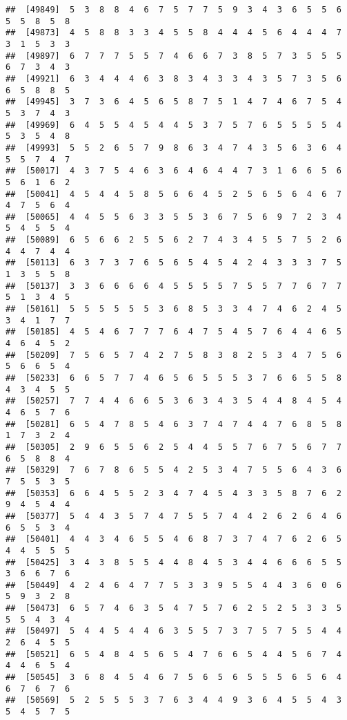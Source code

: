 \documentclass[
]{book}
\begin{document}
\begin{verbatim}
##  [49849]  5  3  8  8  4  6  7  5  7  7  5  9  3  4  3  6  5  5  6  5  5  8  5  8
##  [49873]  4  5  8  8  3  3  4  5  5  8  4  4  4  5  6  4  4  4  7  3  1  5  3  3
##  [49897]  6  7  7  7  5  5  7  4  6  6  7  3  8  5  7  3  5  5  5  6  7  3  4  3
##  [49921]  6  3  4  4  4  6  3  8  3  4  3  3  4  3  5  7  3  5  6  6  5  8  8  5
##  [49945]  3  7  3  6  4  5  6  5  8  7  5  1  4  7  4  6  7  5  4  5  3  7  4  3
##  [49969]  6  4  5  5  4  5  4  4  5  3  7  5  7  6  5  5  5  5  4  5  3  5  4  8
##  [49993]  5  5  2  6  5  7  9  8  6  3  4  7  4  3  5  6  3  6  4  5  5  7  4  7
##  [50017]  4  3  7  5  4  6  3  6  4  6  4  4  7  3  1  6  6  5  6  5  6  1  6  2
##  [50041]  4  5  4  4  5  8  5  6  6  4  5  2  5  6  5  6  4  6  7  4  7  5  6  4
##  [50065]  4  4  5  5  6  3  3  5  5  3  6  7  5  6  9  7  2  3  4  5  4  5  5  4
##  [50089]  6  5  6  6  2  5  5  6  2  7  4  3  4  5  5  7  5  2  6  4  4  7  4  4
##  [50113]  6  3  7  3  7  6  5  6  5  4  5  4  2  4  3  3  3  7  5  1  3  5  5  8
##  [50137]  3  3  6  6  6  6  4  5  5  5  5  7  5  5  7  7  6  7  7  5  1  3  4  5
##  [50161]  5  5  5  5  5  5  3  6  8  5  3  3  4  7  4  6  2  4  5  3  4  1  7  7
##  [50185]  4  5  4  6  7  7  7  6  4  7  5  4  5  7  6  4  4  6  5  4  6  4  5  2
##  [50209]  7  5  6  5  7  4  2  7  5  8  3  8  2  5  3  4  7  5  6  5  6  6  5  4
##  [50233]  6  6  5  7  7  4  6  5  6  5  5  5  3  7  6  6  5  5  8  4  3  4  5  5
##  [50257]  7  7  4  4  6  6  5  3  6  3  4  3  5  4  4  8  4  5  4  4  6  5  7  6
##  [50281]  6  5  4  7  8  5  4  6  3  7  4  7  4  4  7  6  8  5  8  1  7  3  2  4
##  [50305]  2  9  6  5  5  6  2  5  4  4  5  5  7  6  7  5  6  7  7  6  5  8  8  4
##  [50329]  7  6  7  8  6  5  5  4  2  5  3  4  7  5  5  6  4  3  6  7  5  5  3  5
##  [50353]  6  6  4  5  5  2  3  4  7  4  5  4  3  3  5  8  7  6  2  9  4  5  4  4
##  [50377]  5  4  4  3  5  7  4  7  5  5  7  4  4  2  6  2  6  4  6  6  5  5  3  4
##  [50401]  4  4  3  4  6  5  5  4  6  8  7  3  7  4  7  6  2  6  5  4  4  5  5  5
##  [50425]  3  4  3  8  5  5  4  4  8  4  5  3  4  4  6  6  6  5  5  3  6  6  7  6
##  [50449]  4  2  4  6  4  7  7  5  3  3  9  5  5  4  4  3  6  0  6  5  9  3  2  8
##  [50473]  6  5  7  4  6  3  5  4  7  5  7  6  2  5  2  5  3  3  5  5  5  4  3  4
##  [50497]  5  4  4  5  4  4  6  3  5  5  7  3  7  5  7  5  5  4  4  2  6  4  5  5
##  [50521]  6  5  4  8  4  5  6  5  4  7  6  6  5  4  4  5  6  7  4  4  4  6  5  4
##  [50545]  3  6  8  4  5  4  6  7  5  6  5  6  5  5  5  6  5  6  4  6  7  6  7  6
##  [50569]  5  2  5  5  5  3  7  6  3  4  4  9  3  6  4  5  5  4  3  5  4  5  7  5

\end{verbatim}
\end{document}
